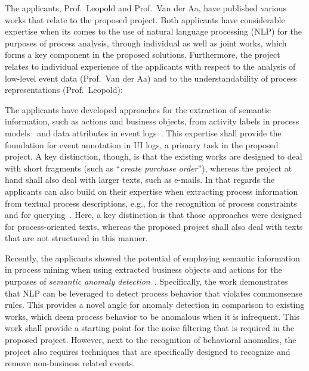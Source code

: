 The applicants, Prof.\ Leopold and Prof.\ Van der Aa, have published various works that relate to the proposed project. Both applicants have considerable expertise when its comes to the use of natural language processing (NLP) for the purposes of process analysis, through individual as well as joint works, which forms a key component in the proposed solutions.
Furthermore, the project relates to individual experience of the applicants with respect to the analysis of low-level event data (Prof.\ Van der Aa) and to the understandability of process representations (Prof.\ Leopold):


The applicants have developed approaches for the extraction of semantic information, such as actions and business objects, from activity labels in process models~\cite{leopold2013detection,leopold2019using} and data attributes in event logs~\cite{rebmann2021extracting}.
This expertise shall provide the foundation for event annotation in UI logs, a primary task in the proposed project. A key distinction, though, is that the existing works are designed to deal with short fragments (such as ``\emph{create purchase order}''), whereas the project at hand shall also deal with larger texts, such as e-mails. In that regards the applicants can also build on their expertise when extracting process information from textual process descriptions, e.g., for the recognition of process constraints~\cite{van2019extracting,winter2020assessing} and for querying~\cite{leopold2019searching}. Here, a key distinction is that those approaches were designed for process-oriented texts, whereas the proposed project shall also deal with texts that are not structured in this manner.

Recently, the applicants showed the potential of employing semantic information in process mining when using extracted business objects and actions for the purposes of \emph{semantic anomaly detection}~\cite{van2021natural}. Specifically, the work demonstrates that NLP can be leveraged to detect process behavior that violates commonsense rules. This provides a novel angle for anomaly detection in comparison to existing works, which deem process behavior to be anomalous when it is infrequent.
This work shall provide a starting point for the noise filtering that is required in the proposed project. However, next to the recognition of behavioral anomalies, the project also requires techniques that are specifically designed to recognize and remove non-business related events.




